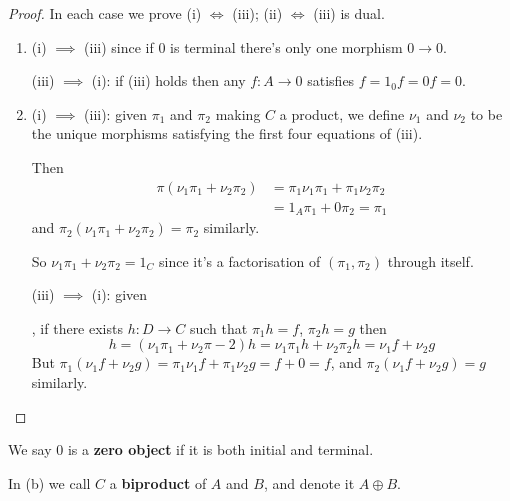 \documentclass[a4paper]{article}
\theoremstyle{definition}
\theoremstyle{remark}
\theoremstyle{default}
\numberwithin{definition}{section}
\begin{document}
\begin{proof}
	In each case we prove (i) $\iff$ (iii); (ii) $\iff$ (iii) is dual.
	\begin{enumerate}[label=\alph*.]
		\item (i) $\implies$ (iii) since if $0$ is terminal there's only one morphism $0 \to 0$.
		
		(iii) $\implies$ (i): if (iii) holds then any $f: A \to 0$ satisfies $f = 1_0 f = 0f = 0$.
		
		\item (i) $\implies$ (iii): given $\pi_1$ and $\pi_2$ making $C$ a product,
		we define $\nu_1$ and $\nu_2$ to be the unique morphisms satisfying the first four equations of (iii).
		
		Then 
		\begin{align*}
			\pi(\nu_1\pi_1 + \nu_2\pi_2) &= \pi_1\nu_1\pi_1 + \pi_1\nu_2\pi_2 \\
			&= 1_A \pi_1 + 0\pi_2 = \pi_1
		\end{align*}
		and $\pi_2(\nu_1\pi_1 + \nu_2\pi_2) = \pi_2$ similarly.
		
		So $\nu_1\pi_1 + \nu_2\pi_2 = 1_C$ since it's a factorisation of $(\pi_1, \pi_2)$ through itself.
		
		(iii) $\implies$ (i): given
		, if there exists $h: D \to C$ such that $\pi_1 h = f$, $\pi_2 h = g$ then
		$$h = (\nu_1 \pi_1 + \nu_2\pi-2)h = \nu_1\pi_1 h + \nu_2 \pi_2 h = \nu_1 f + \nu_2 g$$
		But $\pi_1(\nu_1 f + \nu_2 g) = \pi_1\nu_1 f+ \pi_1\nu_2 g = f + 0 = f$,
		and $\pi_2(\nu_1 f + \nu_2 g) = g$ similarly.
	\end{enumerate}
\end{proof}

We say 0 is a \textbf{zero object} if it is both initial and terminal.

In (b) we call $C$ a \textbf{biproduct} of $A$ and $B$, and denote it $A \oplus B$.
\end{document}
